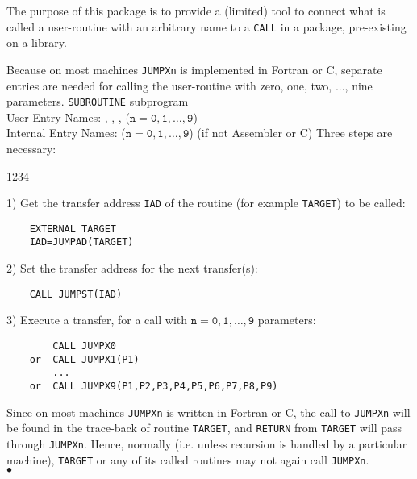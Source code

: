                                  
            
                        
        
The purpose of this package is to provide a (limited) tool to connect
what is called a user-routine with an arbitrary name to a {\tt CALL} in a
package, pre-existing on a library.
\par
Because on most machines {\tt JUMPXn} is implemented in Fortran
or C, separate entries are needed for calling the user-routine
with zero, one, two, ..., nine parameters.
\Structure
{\tt SUBROUTINE} subprogram \\
User Entry Names: , , ,
($\mathtt{n = 0,1,\ldots,9}$) \\
Internal Entry Names:  ($\mathtt{n = 0,1,\ldots,9}$)
(if not Assembler or C)
\Usage
Three steps are necessary:
\begin{DLtt}{1234}
\item[1)] Get the transfer address {\tt IAD} of the routine
(for example {\tt TARGET}) to be called:
\begin{verbatim}
    EXTERNAL TARGET
    IAD=JUMPAD(TARGET)
\end{verbatim}
\item[2)]  Set the transfer address for the next transfer(s):
\begin{verbatim}
    CALL JUMPST(IAD)
\end{verbatim}
\item[3)] Execute a transfer, for a call with $\mathtt{n=0,1,\ldots,9}$
parameters:
\begin{verbatim}
        CALL JUMPX0
    or  CALL JUMPX1(P1)
        ...
    or  CALL JUMPX9(P1,P2,P3,P4,P5,P6,P7,P8,P9)
\end{verbatim}
\end{DLtt}
\Restrict
\par
Since on most machines {\tt JUMPXn} is written in Fortran or C,
the call to {\tt JUMPXn} will be found in the trace-back of routine
{\tt TARGET}, and {\tt RETURN} from {\tt TARGET} will pass through
{\tt JUMPXn}. Hence, normally (i.e. unless recursion is handled by a
particular machine), {\tt TARGET} or any of its called routines may not
again call {\tt JUMPXn}.
\\ $\bullet$
